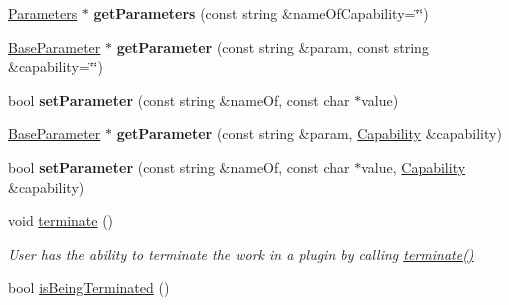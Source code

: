 \begin{DoxyCompactItemize}
\item 
\hypertarget{classrrp_1_1_plugin_a4b71bb36720cf0e7c5a18487c10e5578}{\hyperlink{classrrp_1_1_parameters}{Parameters} $\ast$ {\bfseries get\-Parameters} (const string \&name\-Of\-Capability=\char`\"{}\char`\"{})}\label{classrrp_1_1_plugin_a4b71bb36720cf0e7c5a18487c10e5578}

\item 
\hypertarget{classrrp_1_1_plugin_abc6697dbcaf2d78879a211ba9f3a38c9}{\hyperlink{classrrp_1_1_base_parameter}{Base\-Parameter} $\ast$ {\bfseries get\-Parameter} (const string \&param, const string \&capability=\char`\"{}\char`\"{})}\label{classrrp_1_1_plugin_abc6697dbcaf2d78879a211ba9f3a38c9}

\item 
\hypertarget{classrrp_1_1_plugin_a180a8952816099273294591caeecd7bb}{bool {\bfseries set\-Parameter} (const string \&name\-Of, const char $\ast$value)}\label{classrrp_1_1_plugin_a180a8952816099273294591caeecd7bb}

\item 
\hypertarget{classrrp_1_1_plugin_a09f84399d95cf17c8bfbd4ca8ba4541d}{\hyperlink{classrrp_1_1_base_parameter}{Base\-Parameter} $\ast$ {\bfseries get\-Parameter} (const string \&param, \hyperlink{classrrp_1_1_capability}{Capability} \&capability)}\label{classrrp_1_1_plugin_a09f84399d95cf17c8bfbd4ca8ba4541d}

\item 
\hypertarget{classrrp_1_1_plugin_ac7cd7ff71f3308f47b10a191fa23f58e}{bool {\bfseries set\-Parameter} (const string \&name\-Of, const char $\ast$value, \hyperlink{classrrp_1_1_capability}{Capability} \&capability)}\label{classrrp_1_1_plugin_ac7cd7ff71f3308f47b10a191fa23f58e}

\item 
\hypertarget{classrrp_1_1_plugin_a74a45d2648335936561898c390281a6a}{void \hyperlink{classrrp_1_1_plugin_a74a45d2648335936561898c390281a6a}{terminate} ()}\label{classrrp_1_1_plugin_a74a45d2648335936561898c390281a6a}

\begin{DoxyCompactList}\small\item\em User has the ability to terminate the work in a plugin by calling \hyperlink{classrrp_1_1_plugin_a74a45d2648335936561898c390281a6a}{terminate()} \end{DoxyCompactList}\item 
\hypertarget{classrrp_1_1_plugin_ac2776abcc4000a1561343143ca153613}{bool \hyperlink{classrrp_1_1_plugin_ac2776abcc4000a1561343143ca153613}{is\-Being\-Terminated} ()}\label{classrrp_1_1_plugin_ac2776abcc4000a1561343143ca153613}


\end{DoxyCompactItemize}

